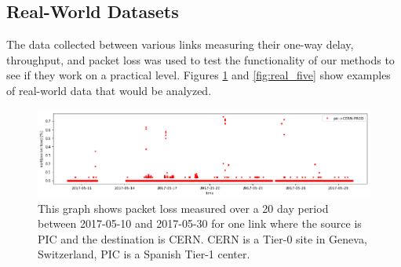 \documentclass[5p]{elsarticle}
\begin{document}
\begin{table}[htbp]
\centering
\caption{The time period and features affected for each anomaly generated by the simulated data. Feature numbers were listed in descending order of significance towards the data.}
\label{table:aintervals}
\end{table}

\fi


\subsection{Real-World Datasets}

The data collected between various links measuring their one-way delay, throughput, and packet loss was used to test the functionality of our methods to see if they work on a practical level. Figures \ref{fig:real_one} and \ref{fig:real_five} show examples of real-world data that would be analyzed.

\begin{figure}[htbp]
    \centering
    \includegraphics[width=\linewidth]{real_data_one_link.png}
    \caption{This graph shows packet loss measured over a 20 day period between 2017-05-10 and 2017-05-30 for one link where the source is PIC and the destination is CERN. CERN is a Tier-0 site in Geneva, Switzerland, PIC is a Spanish Tier-1 center.}
    \label{fig:real_one}
\end{figure}
\end{document}

